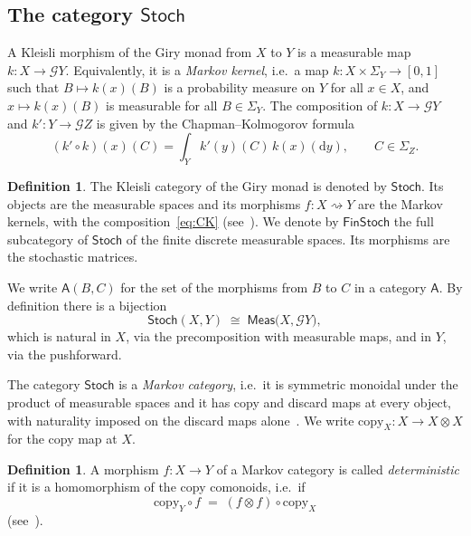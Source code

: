 \documentclass[11pt,a4paper]{article}
\theoremstyle{plain}
\theoremstyle{definition}
\newtheorem{definition}[theorem]{Definition}
\theoremstyle{remark}
\newcommand{\cat}[1]{\mathsf{#1}}
\newcommand{\Meas}{\cat{Meas}}
\newcommand{\Stoch}{\cat{Stoch}}
\newcommand{\FinStoch}{\cat{FinStoch}}
\newcommand{\G}{\mathcal{G}}
\begin{document}
\subsection{The category \texorpdfstring{$\Stoch$}{Stoch}}

A Kleisli morphism of the Giry monad from $X$ to $Y$ is a measurable map
$k \colon X\to\G Y$. Equivalently, it is a \emph{Markov kernel}, i.e.\ a map
$k \colon X\times\Sigma_Y\to[0,1]$ such that $B\mapsto k(x)(B)$ is a
probability measure on $Y$ for all $x\in X$, and $x\mapsto k(x)(B)$ is
measurable for all $B\in\Sigma_Y$. The composition of $k \colon X\to\G Y$ and
$k' \colon Y\to\G Z$ is given by the Chapman--Kolmogorov formula
\begin{equation}\label{eq:CK}
(k'\circ k)(x)(C)
=
\int_Y k'(y)(C)\,k(x)(\mathrm{d}y),
\qquad
C\in\Sigma_Z.
\end{equation}

\begin{definition}\label{def:stoch}
The Kleisli category of the Giry monad is denoted by $\Stoch$. Its objects are
the measurable spaces and its morphisms $f \colon X \rightsquigarrow Y$ are
the Markov kernels, with the composition~\eqref{eq:CK}
(see~\cite{fritz_synthetic_2020,giry_categorical_1982,perrone_markov_2024}).
We denote by $\FinStoch$ the full subcategory of $\Stoch$ of the finite
discrete measurable spaces. Its morphisms are the stochastic matrices.
\end{definition}

We write $\cat{A}(B,C)$ for the set of the morphisms from $B$ to $C$ in a
category $\cat{A}$. By definition there is a bijection
\begin{equation}\label{eq:kleisli}
\Stoch(X, Y) \;\cong\; \Meas\bigl(X, \G Y\bigr),
\end{equation}
which is natural in $X$, via the precomposition with measurable maps, and in
$Y$, via the pushforward.

The category $\Stoch$ is a \emph{Markov category}, i.e.\ it is symmetric
monoidal under the product of measurable spaces and it has copy and discard
maps at every object, with naturality imposed on the discard maps
alone~\cite[Def.~2.1]{fritz_synthetic_2020}. We write
$\mathrm{copy}_{X} \colon X \to X \otimes X$ for the copy map at $X$.

\begin{definition}\label{def:deterministic}
A morphism $f \colon X \to Y$ of a Markov category is called
\emph{deterministic} if it is a homomorphism of the copy comonoids, i.e.\ if
\[
\mathrm{copy}_{Y} \circ f \;=\; (f \otimes f) \circ \mathrm{copy}_{X}
\]
(see~\cite[Def.~10.1]{fritz_synthetic_2020}).
\end{definition}
\end{document}
